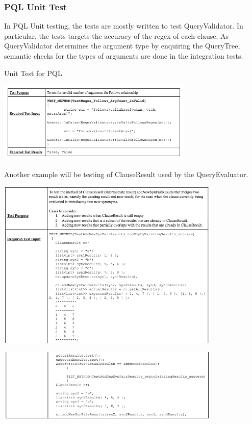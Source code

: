\documentclass[12pt]{article}
\begin{document}
{{{{{{{{{{\subsubsection{PQL Unit Test}
In PQL Unit testing, the tests are mostly written to test QueryValidator. In particular, the tests targets the accuracy of the regex of each clause. As QueryValidator determines the argument type by enquiring the QueryTree, semantic checks for the types of arguments are done in the integration tests.
\begin{table}[!htbp]
  \centering 
  \caption{Unit Test for PQL}
 \includegraphics[width=0.7\textwidth]{PQL1.png}
\end{table}
\newline Another example will be testing of ClauseResult used by the QueryEvaluator.
\begin{table}[!htbp]
  \centering 
  \includegraphics[width=0.8\textwidth]{PQL2.png}
\end{table}
\begin{table}[!htbp]
  \centering 
  \includegraphics[width=0.8\textwidth]{PQL3.png}

\end{table}}}}}}}}}}}
\end{document}
